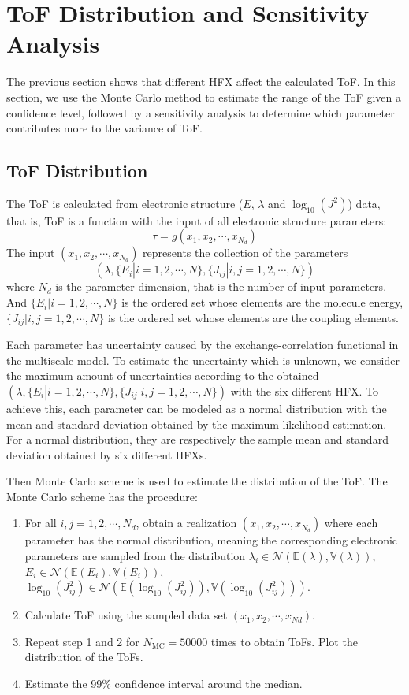 \documentclass[%
 reprint,
 amsmath,amssymb,
 aps,
]{revtex4-2}
\begin{document}
\section{ToF Distribution and Sensitivity Analysis}
The previous section shows that different HFX affect the calculated ToF. In this section, we use the Monte Carlo method to estimate the range of the ToF given a confidence level, followed by a sensitivity analysis to determine which parameter contributes more to the variance of ToF. 

\subsection{ToF Distribution}
The ToF is calculated from electronic structure ($E$, $\lambda$ and $\log_{10}(J^2)$) data, that is, ToF is a function with the input of all electronic structure parameters:
\begin{equation}
    \tau = g(x_1, x_2, \cdots, x_{N_d})
    \label{eq:tau1}
\end{equation}
The input $(x_1, x_2, \cdots, x_{N_d})$ represents the collection of the parameters $$(\lambda, \{E_i|i=1,2,\cdots,N \}, \{J_{ij}|i,j=1,2,\cdots,N \})$$  where $N_d$ is the parameter dimension, that is the number of input parameters. 
And $\{E_i|i=1,2,\cdots,N \}$ is the ordered set whose elements are the molecule energy,
$\{J_{ij}|i,j=1,2,\cdots,N \}$ is the ordered set whose elements are the coupling elements. 

Each parameter has uncertainty caused by the exchange-correlation functional in the multiscale model.
To estimate the uncertainty which is unknown, we consider the maximum amount of uncertainties according to the obtained $(\lambda, \{E_i|i=1,2,\cdots,N \}, \{J_{ij}|i,j=1,2,\cdots,N \})$ with the six different HFX.
To achieve this, each parameter can be modeled as a normal distribution with the mean and standard deviation obtained by the maximum likelihood estimation. For a normal distribution, they are respectively the sample mean and standard deviation obtained by six different HFXs.

Then Monte Carlo scheme is used to estimate the distribution of the ToF. The Monte Carlo scheme has the procedure:
\begin{enumerate}
\item For all $i,j=1,2,\cdots, N_d$, obtain a realization $(x_1, x_2, \cdots, x_{N_d})$ where each parameter has the normal distribution, meaning the corresponding electronic parameters are sampled from the distribution $\lambda_i \in \mathcal{N}(\mathbb{E}(\lambda), \mathbb{V}(\lambda))$, $E_i \in \mathcal{N}(\mathbb{E}(E_i), \mathbb{V}(E_i))$, $\log_{10}(J_{ij}^2) \in \mathcal{N}(\mathbb{E}(\log_{10}(J_{ij}^2)), \mathbb{V}(\log_{10}(J_{ij}^2)))$. 
\item Calculate ToF using the sampled data set $(x_1, x_2, \cdots, x_{Nd})$. 
\item Repeat step 1 and 2 for $N_\text{MC} = 50000$ times to obtain ToFs. Plot the distribution of the ToFs.
\item Estimate the 99\% confidence interval around the median.
\end{enumerate}
\end{document}
